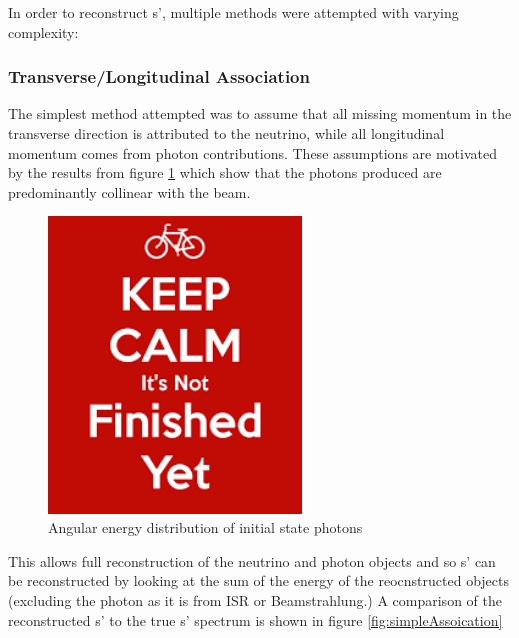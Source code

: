In order to reconstruct s', multiple methods were attempted with varying complexity:

\subsubsection{Transverse/Longitudinal Association}
The simplest method attempted was to assume that all missing momentum in the transverse direction is attributed to the neutrino, while all longitudinal momentum comes from photon contributions. These assumptions are motivated by the results from figure \ref{fig:photonspectrum} which show that the photons produced are predominantly collinear with the beam.

\begin{figure}
  \centering
  \includegraphics[width=0.6\textwidth]{TopAnalysis/figures/dummy}
  \caption[Angular energy distribution of initial state photons]{Angular energy distribution of initial state photons}
  \label{fig:photonspectrum}
\end{figure}

This allows full reconstruction of the neutrino and photon objects and so s' can be reconstructed by looking at the sum of the energy of the reocnstructed objects (excluding the photon as it is from ISR or Beamstrahlung.) A comparison of the reconstructed s' to the true s' spectrum is shown in figure \ref{fig:simpleAssoication}

